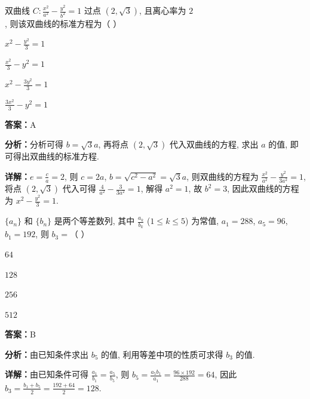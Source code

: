 \begin{question}[points=4]
双曲线 $C:\frac{x^2}{a^2}-\frac{y^2}{b^2}=1$ 过点 $(2,\sqrt{3})$, 且离心率为 $2$, 则该双曲线的标准方程为（ ）
\begin{choices}
  \item $x^2-\frac{y^2}{3}=1$
  \item $\frac{x^2}{3}-y^2=1$
  \item $x^2-\frac{3y^2}{3}=1$
  \item $\frac{3x^2}{3}-y^2=1$
\end{choices}
\begin{solution}
\textbf{答案：}A

\textbf{分析：}分析可得 $b=\sqrt{3}a$, 再将点 $(2,\sqrt{3})$ 代入双曲线的方程, 求出 $a$ 的值, 即可得出双曲线的标准方程.

\textbf{详解：}$e=\frac{c}{a}=2$, 则 $c=2a$, $b=\sqrt{c^2-a^2}=\sqrt{3}a$, 则双曲线的方程为 $\frac{x^2}{a^2}-\frac{y^2}{3a^2}=1$, 将点 $(2,\sqrt{3})$ 代入可得 $\frac{4}{a^2}-\frac{3}{3a^2}=1$, 解得 $a^2=1$, 故 $b^2=3$, 因此双曲线的方程为 $x^2-\frac{y^2}{3}=1$.
\end{solution}
\end{question}

\begin{question}[points=4]
$\{a_n\}$ 和 $\{b_n\}$ 是两个等差数列, 其中 $\frac{a_k}{b_k}$ ($1\leq k\leq 5$) 为常值, $a_1=288$, $a_5=96$, $b_1=192$, 则 $b_3=$（ ）
\begin{choices}
  \item $64$
  \item $128$
  \item $256$
  \item $512$
\end{choices}
\begin{solution}
\textbf{答案：}B

\textbf{分析：}由已知条件求出 $b_5$ 的值, 利用等差中项的性质可求得 $b_3$ 的值.

\textbf{详解：}由已知条件可得 $\frac{a_1}{b_1}=\frac{a_5}{b_5}$, 则 $b_5=\frac{a_5 b_1}{a_1}=\frac{96\times192}{288}=64$, 因此 $b_3=\frac{b_1+b_5}{2}=\frac{192+64}{2}=128$.
\end{solution}
\end{question}

